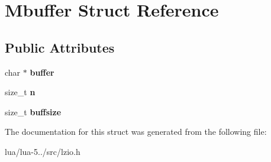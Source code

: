 \hypertarget{struct_mbuffer}{\section{Mbuffer Struct Reference}
\label{struct_mbuffer}
}
\subsection*{Public Attributes}
\begin{DoxyCompactItemize}
\item 
\hypertarget{struct_mbuffer_a857012deb824b216c19d7e4d15be5561}{char $\ast$ {\bfseries buffer}}\label{struct_mbuffer_a857012deb824b216c19d7e4d15be5561}

\item 
\hypertarget{struct_mbuffer_abd195588f24e02b6f5bfb1a39a109380}{size\+\_\+t {\bfseries n}}\label{struct_mbuffer_abd195588f24e02b6f5bfb1a39a109380}

\item 
\hypertarget{struct_mbuffer_a48bbc7ce4413bf1cf9f4825f1ce36e41}{size\+\_\+t {\bfseries buffsize}}\label{struct_mbuffer_a48bbc7ce4413bf1cf9f4825f1ce36e41}

\end{DoxyCompactItemize}


The documentation for this struct was generated from the following file\+:\begin{DoxyCompactItemize}
\item 
lua/lua-\/5../src/lzio.\+h\end{DoxyCompactItemize}
